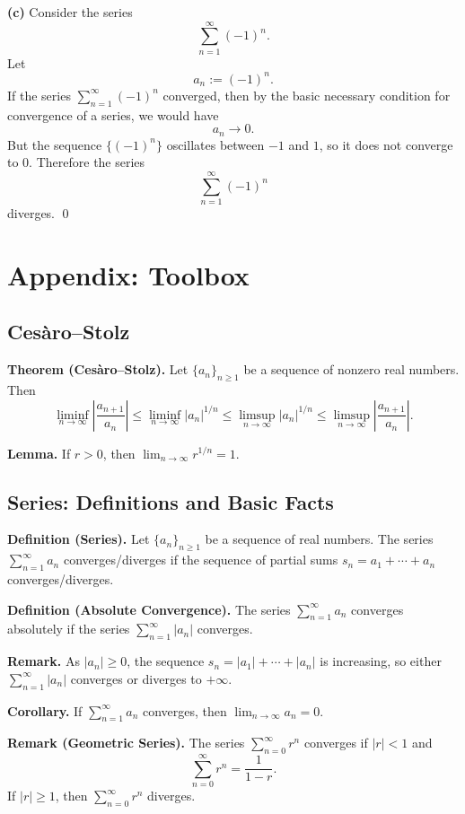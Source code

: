 \documentclass[12pt]{article}
\begin{document}
\textbf{(c)} Consider the series
\[
\sum_{n=1}^{\infty} (-1)^n.
\]
Let
\[
a_n := (-1)^n.
\]
If the series $\sum_{n=1}^{\infty} (-1)^n$ converged, then by the basic necessary condition for convergence of a series, we would have
\[
a_n \to 0.
\]
But the sequence $\{(-1)^n\}$ oscillates between $-1$ and $1$, so it does not converge to $0$. Therefore the series
\[
\sum_{n=1}^{\infty} (-1)^n
\]
diverges.
\qed

\newpage
\appendix
\section*{Appendix: Toolbox}
\subsection*{Ces\`aro--Stolz}
\textbf{Theorem (Ces\`aro--Stolz).} Let $\{a_n\}_{n\ge 1}$ be a sequence of
nonzero real numbers. Then
\[
\liminf_{n\to\infty}\left|\frac{a_{n+1}}{a_n}\right|
\le \liminf_{n\to\infty} |a_n|^{1/n}
\le \limsup_{n\to\infty} |a_n|^{1/n}
\le \limsup_{n\to\infty}\left|\frac{a_{n+1}}{a_n}\right|.
\]

\textbf{Lemma.} If $r>0$, then $\lim_{n\to\infty} r^{1/n}=1$.

\subsection*{Series: Definitions and Basic Facts}
\textbf{Definition (Series).} Let $\{a_n\}_{n\ge 1}$ be a sequence of real
numbers. The series $\sum_{n=1}^{\infty} a_n$ converges/diverges if the sequence
of partial sums $s_n=a_1+\cdots+a_n$ converges/diverges.

\textbf{Definition (Absolute Convergence).} The series $\sum_{n=1}^{\infty} a_n$
converges absolutely if the series $\sum_{n=1}^{\infty} |a_n|$ converges.

\textbf{Remark.} As $|a_n|\ge 0$, the sequence
$s_n=|a_1|+\cdots+|a_n|$ is increasing, so either
$\sum_{n=1}^{\infty} |a_n|$ converges or diverges to $+\infty$.

\textbf{Corollary.} If $\sum_{n=1}^{\infty} a_n$ converges, then
$\lim_{n\to\infty} a_n=0$.

\textbf{Remark (Geometric Series).} The series $\sum_{n=0}^{\infty} r^n$
converges if $|r|<1$ and
\[
\sum_{n=0}^{\infty} r^n=\frac{1}{1-r}.
\]
If $|r|\ge 1$, then $\sum_{n=0}^{\infty} r^n$ diverges.
\end{document}
